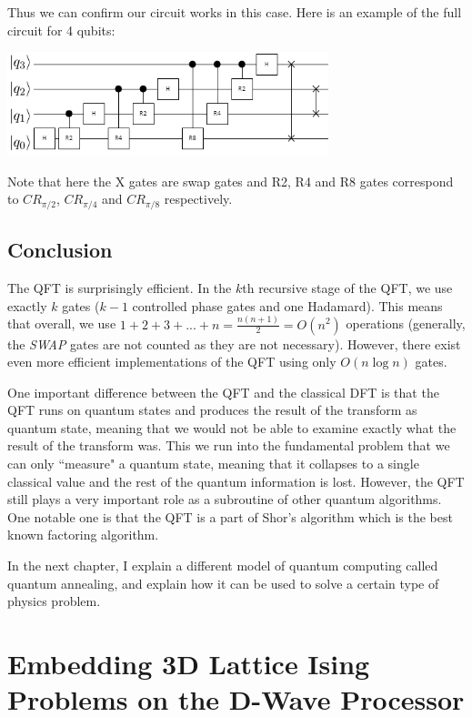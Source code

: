 \documentclass[11pt]{report}
\newcommand{\?}{\stackrel{?}{=}}
\begin{document}
Thus we can confirm our circuit works in this case. Here is an example of the full circuit for 4 qubits:

\begin{center}
\includegraphics[width=0.7\textwidth]{resources/images/qft4.png}
\end{center}

Note that here the X gates are swap gates and R2, R4 and R8 gates correspond to $CR_{\pi/2}$, $CR_{\pi/4}$ and $CR_{\pi/8}$ respectively.

\section{Conclusion}
The QFT is surprisingly efficient. In the $k$th recursive stage of the QFT, we use exactly $k$ gates ($k-1$ controlled phase gates and one Hadamard). This means that overall, we use $1 + 2 + 3 + ... + n = \frac{n(n+1)}{2} = O(n^2)$ operations (generally, the \textit{SWAP} gates are not counted as they are not necessary). However, there exist even more efficient implementations of the QFT using only $O(n\log n)$ gates.

One important difference between the QFT and the classical DFT is that the QFT runs on quantum states and produces the result of the transform as quantum state, meaning that we would not be able to examine exactly what the result of the transform was. This we run into the fundamental problem that we can only ``measure" a quantum state, meaning that it collapses to a single classical value and the rest of the quantum information is lost. However, the QFT still plays a very important role as a subroutine of other quantum algorithms. One notable one is that the QFT is a part of Shor's algorithm which is the best known factoring algorithm.

In the next chapter, I explain a different model of quantum computing called quantum annealing, and explain how it can be used to solve a certain type of physics problem.

\chapter{Embedding 3D Lattice Ising Problems on the D-Wave Processor}
\end{document}
